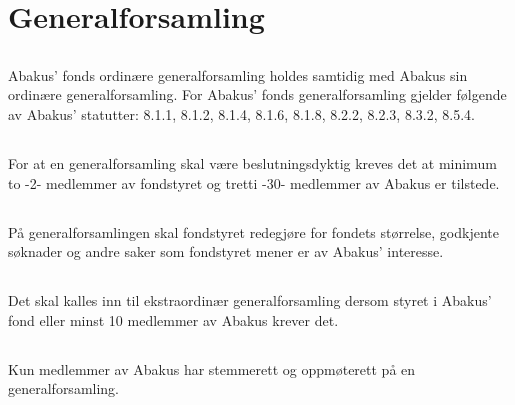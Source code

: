 \section{Generalforsamling}

\subsection{}
Abakus’ fonds ordinære generalforsamling holdes samtidig med Abakus sin
ordinære generalforsamling. For Abakus’ fonds generalforsamling gjelder
følgende av Abakus’ statutter: 8.1.1, 8.1.2, 8.1.4, 8.1.6, 8.1.8, 8.2.2,
8.2.3, 8.3.2, 8.5.4. 

\subsection{}
For at en generalforsamling skal være beslutningsdyktig kreves det at minimum
to -2- medlemmer av fondstyret og tretti -30- medlemmer av Abakus er tilstede. 

\subsection{}
På generalforsamlingen skal fondstyret redegjøre for fondets størrelse,
godkjente søknader og andre saker som fondstyret mener er av Abakus’
interesse. 

\subsection{}
Det skal kalles inn til ekstraordinær generalforsamling dersom styret i
Abakus’ fond eller minst 10 medlemmer av Abakus krever det.

\subsection{}
Kun medlemmer av Abakus har stemmerett og oppmøterett på en generalforsamling.
